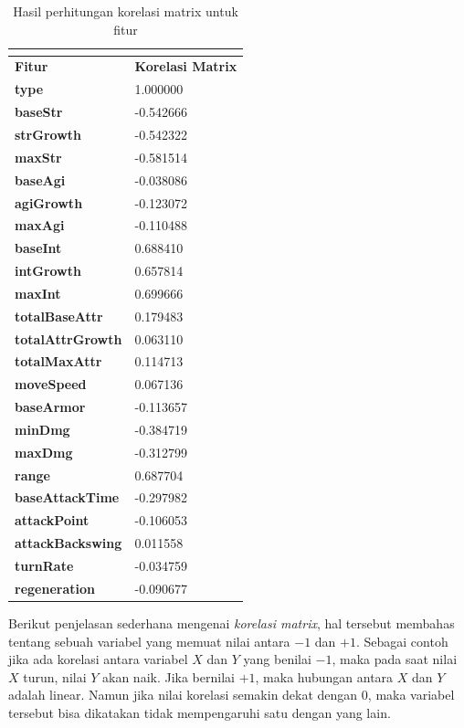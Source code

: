 \begin{longtable}{|l|l|}
	\caption{Hasil perhitungan korelasi matrix untuk fitur}
	\vspace{1ex}
	\label{tb:dota2_matrix_corel}\\
	\hline
	\rowcolor[HTML]{C0C0C0} 
	\textbf{Fitur} & \textbf{Korelasi Matrix} \\ \hline
	\textbf{type} & 1.000000 \\ \hline
	\textbf{baseStr} & -0.542666 \\ \hline
	\textbf{strGrowth} & -0.542322 \\ \hline
	\textbf{maxStr} & -0.581514 \\ \hline
	\textbf{baseAgi} & -0.038086 \\ \hline
	\textbf{agiGrowth} & -0.123072 \\ \hline
	\textbf{maxAgi} & -0.110488 \\ \hline
	\textbf{baseInt} & 0.688410 \\ \hline
	\textbf{intGrowth} & 0.657814 \\ \hline
	\textbf{maxInt} & 0.699666 \\ \hline
	\textbf{totalBaseAttr} & 0.179483 \\ \hline
	\textbf{totalAttrGrowth} & 0.063110 \\ \hline
	\textbf{totalMaxAttr} & 0.114713 \\ \hline
	\textbf{moveSpeed} & 0.067136 \\ \hline
	\textbf{baseArmor} & -0.113657 \\ \hline
	\textbf{minDmg} & -0.384719 \\ \hline
	\textbf{maxDmg} & -0.312799 \\ \hline
	\textbf{range} & 0.687704 \\ \hline
	\textbf{baseAttackTime} & -0.297982 \\ \hline
	\textbf{attackPoint} & -0.106053 \\ \hline
	\textbf{attackBackswing} & 0.011558 \\ \hline
	\textbf{turnRate} & -0.034759 \\ \hline
	\textbf{regeneration} & -0.090677 \\ \hline
\end{longtable}

Berikut penjelasan sederhana mengenai \textit{korelasi matrix}, hal tersebut membahas tentang sebuah variabel yang memuat nilai antara $-1$ dan $+1$. Sebagai contoh jika ada korelasi antara variabel $X$ dan $Y$ yang benilai $-1$, maka pada saat nilai $X$ turun, nilai $Y$ akan naik. Jika bernilai $+1$, maka hubungan antara $X$ dan $Y$ adalah linear. Namun jika nilai korelasi semakin dekat dengan $0$, maka variabel tersebut bisa dikatakan tidak mempengaruhi satu dengan yang lain.
\vspace{1ex}

